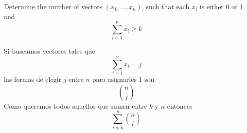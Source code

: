 \item Determine the number of vectors $(x_1,\dots ,x_n)$, such that each $x_i$ is either 0 or 1 and 
\[ \sum_{i=1}^n x_i \ge k \]

Si buscamos vectores tales que
\[ \sum_{i=1}^n x_i = j \]
las formas de elegir $j$ entre $n$ para asignarles 1 son
\[ \binom{n}{j} \]
Como queremos todos aquellos que sumen entre $k$ y $n$ entonces
\[ \sum_{i=k}^n \binom{n}{i} \]
